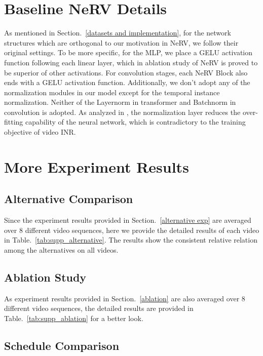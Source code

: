 \documentclass[runningheads]{llncs}
\begin{document}
\section{Baseline NeRV Details}

As mentioned in Section.~\ref{datasets and implementation}, for the network structures which are orthogonal to our motivation in NeRV, we follow their original settings. To be more specific, for the MLP, we place a GELU activation function following each linear layer, which in ablation study of NeRV\cite{chen2021nerv} is proved to be superior of other activations. For convolution stages, each NeRV Block also ends with a GELU activation function. Additionally, we don't adopt any of the normalization modules in our model except for the temporal instance normalization. Neither of the Layernorm in transformer and Batchnorm in convolution is adopted. As analyzed in \cite{chen2021nerv}, the normalization layer reduces the over-fitting capability of the neural network, which is contradictory to the training objective of video INR.

\section{More Experiment Results}

\subsection{Alternative Comparison}

Since the experiment results provided in Section.~\ref{alternative exp} are averaged over 8 different video sequences, here we provide the detailed results of each video in Table.~\ref{tab:supp_alternative}. The results show the consistent relative relation among the alternatives on all videos.

\subsection{Ablation Study}

As experiment results provided in Section.~\ref{ablation} are also averaged over 8 different video sequences, the detailed results are provided in Table.~\ref{tab:supp_ablation} for a better look.

\subsection{Schedule Comparison}
\end{document}
